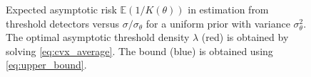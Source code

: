 \documentclass[letterpaper, conference]{IEEEtran}      %
\begin{document}
%
\begin{figure}
\begin{center}
\caption{Expected asymptotic risk $\mathbb E (1/K(\theta))$ in estimation from threshold detectors versus $\sigma/\sigma_\theta$ for a uniform prior with variance $\sigma_\theta^2$. The optimal asymptotic threshold density $\lambda$ (red) is obtained by solving \eqref{eq:cvx_average}. The bound (blue) is obtained using \eqref{eq:upper_bound}. 
\label{fig:dist_bound_uniform}  }
\end{center}
\end{figure}
\end{document}
